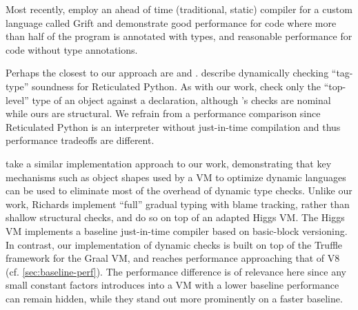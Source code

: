 Most recently, \citet{Kuhlenschmidt:2018:preprint} employ an
ahead of time (\ie traditional, static) compiler for a custom
language called Grift and demonstrate good performance for code where more than
half of the program is annotated with types, and reasonable
performance for code without type annotations. 



Perhaps the closest to our approach are \citet{Greenman2018}
and \citet{Richards2017}.
\citeauthor{Greenman2018} describe dynamically checking ``tag-type''
soundness for Reticulated Python.
As with our work, \citeauthor{Greenman2018} check only the ``top-level'' type of an
object against a declaration, although \citeauthor{Greenman2018}'s checks are nominal
while ours are structural.
We refrain from a performance comparison since
Reticulated Python is an interpreter without just-in-time compilation
and thus performance tradeoffs are different.

\citet{Richards2017} take a similar implementation
approach to our work, demonstrating that key mechanisms such as object shapes
used by a VM to optimize dynamic languages can be used to eliminate most of
the overhead of dynamic type checks.
Unlike our work, Richards
implement ``full'' gradual typing with blame tracking, rather than
shallow structural checks, and do so on top of an adapted Higgs
VM.
The Higgs VM implements a baseline just-in-time compiler based on
basic-block versioning\citep{Chevalier-Boisvert:2016:ITS}.
In contrast, our implementation of dynamic checks
is built on top of the Truffle framework for the Graal VM, and reaches
performance approaching that of V8 (cf. \cref{sec:baseline-perf}).
The performance difference is of relevance here since any small constant factors
introduces into a VM with a lower baseline performance can remain hidden,
while they stand out more prominently on a faster baseline.

